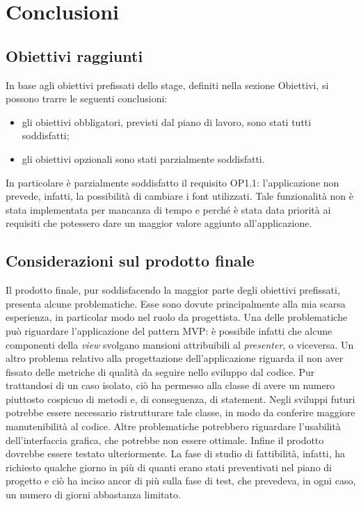 \documentclass[../Tesi.tex]{subfiles}
\begin{document}
\section{Conclusioni}
	\subsection{Obiettivi raggiunti}
	In base agli obiettivi prefissati dello stage, definiti nella sezione Obiettivi, si possono trarre le seguenti conclusioni:
	\begin{itemize}
		\item gli obiettivi obbligatori, previsti dal piano di lavoro, sono stati tutti soddisfatti;
		\item gli obiettivi opzionali sono stati parzialmente soddisfatti.
	\end{itemize}
	In particolare è parzialmente soddisfatto il requisito OP1.1: l'applicazione non prevede, infatti, la possibilità di cambiare i font utilizzati. Tale funzionalità non è stata implementata per mancanza di tempo e perché è stata data priorità ai requisiti che potessero dare un maggior valore aggiunto all'applicazione.

	\subsection{Considerazioni sul prodotto finale}
	Il prodotto finale, pur soddisfacendo la maggior parte degli obiettivi prefissati, presenta alcune problematiche. Esse sono dovute principalmente alla mia scarsa esperienza, in particolar modo nel ruolo da progettista. Una delle problematiche può riguardare l'applicazione del pattern MVP: è possibile infatti che alcune componenti della \textit{view} svolgano mansioni attribuibili al \textit{presenter}, o viceversa. Un altro problema relativo alla progettazione dell'applicazione riguarda il non aver fissato delle metriche di qualità da seguire nello sviluppo dal codice. Pur trattandosi di un caso isolato, ciò ha permesso alla classe  di avere un numero piuttosto cospicuo di metodi e, di conseguenza, di statement. Negli sviluppi futuri potrebbe essere necessario ristrutturare tale classe, in modo da conferire maggiore manutenibilità al codice. Altre problematiche potrebbero riguardare l'usabilità dell'interfaccia grafica, che potrebbe non essere ottimale. Infine il prodotto dovrebbe essere testato ulteriormente. La fase di studio di fattibilità, infatti, ha richiesto qualche giorno in più di quanti erano stati preventivati nel piano di progetto e ciò ha inciso ancor di più sulla fase di test, che prevedeva, in ogni caso, un numero di giorni abbastanza limitato.
\end{document}
